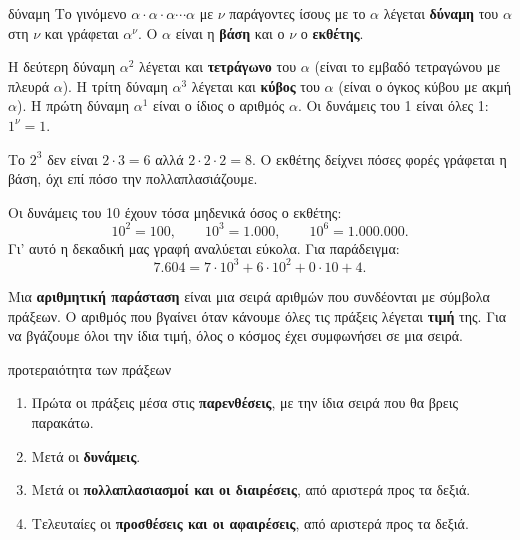 
\begin{orismos}{δύναμη}
Το γινόμενο $\alpha\cdot\alpha\cdot\alpha\cdots\alpha$ με $\nu$ παράγοντες ίσους με το $\alpha$ λέγεται \textbf{δύναμη} του $\alpha$ στη $\nu$ και γράφεται $\alpha^{\nu}$. Ο $\alpha$ είναι η \textbf{βάση} και ο $\nu$ ο \textbf{εκθέτης}.
\end{orismos}

Η δεύτερη δύναμη $\alpha^2$ λέγεται και \textbf{τετράγωνο} του $\alpha$ (είναι το εμβαδό τετραγώνου με πλευρά $\alpha$). Η τρίτη δύναμη $\alpha^3$ λέγεται και \textbf{κύβος} του $\alpha$ (είναι ο όγκος κύβου με ακμή $\alpha$). Η πρώτη δύναμη $\alpha^1$ είναι ο ίδιος ο αριθμός $\alpha$. Οι δυνάμεις του 1 είναι όλες 1: $1^{\nu}=1$.

\begin{prosoxi}
Το $2^3$ δεν είναι $2\cdot 3=6$ αλλά $2\cdot 2\cdot 2=8$. Ο εκθέτης δείχνει πόσες φορές γράφεται η βάση, όχι επί πόσο την πολλαπλασιάζουμε.
\end{prosoxi}


Οι δυνάμεις του 10 έχουν τόσα μηδενικά όσος ο εκθέτης:
$$10^2=100,\qquad 10^3=1.000,\qquad 10^6=1.000.000.$$
Γι' αυτό η δεκαδική μας γραφή αναλύεται εύκολα. Για παράδειγμα:
$$7.604=7\cdot 10^3+6\cdot 10^2+0\cdot 10+4.$$


Μια \textbf{αριθμητική παράσταση} είναι μια σειρά αριθμών που συνδέονται με σύμβολα πράξεων. Ο αριθμός που βγαίνει όταν κάνουμε όλες τις πράξεις λέγεται \textbf{τιμή} της. Για να βγάζουμε όλοι την ίδια τιμή, όλος ο κόσμος έχει συμφωνήσει σε μια σειρά.

\begin{kanonas}{προτεραιότητα των πράξεων}
\begin{enumerate}[leftmargin=1.6em,itemsep=0.2ex,topsep=2pt]
\item Πρώτα οι πράξεις μέσα στις \textbf{παρενθέσεις}, με την ίδια σειρά που θα βρεις παρακάτω.
\item Μετά οι \textbf{δυνάμεις}.
\item Μετά οι \textbf{πολλαπλασιασμοί και οι διαιρέσεις}, από αριστερά προς τα δεξιά.
\item Τελευταίες οι \textbf{προσθέσεις και οι αφαιρέσεις}, από αριστερά προς τα δεξιά.
\end{enumerate}
\end{kanonas}

